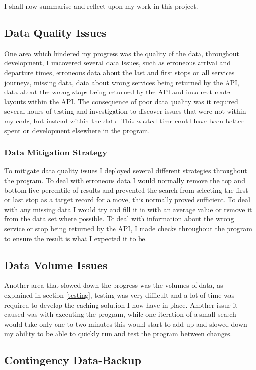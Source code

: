 \documentclass{article}
\begin{document}
I shall now summarise and reflect upon my work in this project.


\subsection{Data Quality Issues} 
One area which hindered my progress was the quality of the data, throughout development, I uncovered several data issues, such as erroneous arrival and departure times, erroneous data about the last and first stops on all services journeys, missing data, data about wrong services being returned by the API, data about the wrong stops being returned by the API and incorrect route layouts within the API. The consequence of poor data quality was it required several hours of testing and investigation to discover issues that were not within my code, but instead within the data. This wasted time could have been better spent on development elsewhere in the program.  


\subsubsection{Data Mitigation Strategy}
To mitigate data quality issues I deployed several different strategies throughout the program. To deal with erroneous data I would normally remove the top and bottom five percentile of results and prevented the search from selecting the first or last stop as a target record for a move, this normally proved sufficient. To deal with any missing data I would try and fill it in with an average value or remove it from the data set where possible. To deal with information about the wrong service or stop being returned by the API, I made checks throughout the program to ensure the result is what I expected it to be. 


\subsection{Data Volume Issues}
Another area that slowed down the progress was the volumes of data, as explained in section \ref{testing}, testing was very difficult and a lot of time was required to develop the caching solution I now have in place. Another issue it caused was with executing the program, while one iteration of a small search would take only one to two minutes this would start to add up and slowed down my ability to be able to quickly run and test the program between changes. 

\subsection{Contingency Data-Backup}
\end{document}

